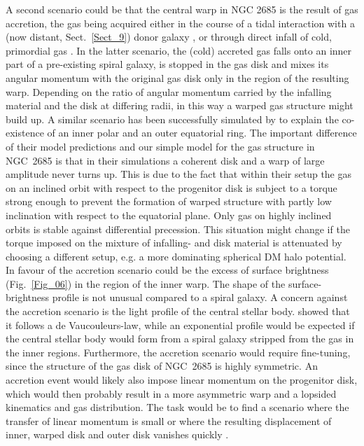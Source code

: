 \documentclass[oldversion]{aa}
\begin{document}
A second scenario could be that the central warp in NGC 2685 is the
result of gas accretion, the gas being acquired either in the course
of a tidal interaction with a (now distant, Sect.~\ref{Sect_9}) donor
galaxy \citep[][]{Schweizer83,Reshetnikov97,Bournaud03}, or through
direct infall of cold, primordial gas \citep[][]{Maccio06}.  In the
latter scenario, the (cold) accreted gas falls onto an inner part of a
pre-existing spiral galaxy, is stopped in the gas disk and mixes its
angular momentum with the original gas disk only in the region of the
resulting warp. Depending on the ratio of angular momentum carried by
the infalling material and the disk at differing radii, in this way a
warped gas structure might build up. A similar scenario has been
successfully simulated by \citet[][]{Bournaud03} to explain the
co-existence of an inner polar and an outer equatorial ring. The
important difference of their model predictions and our simple model
for the gas structure in NGC~2685 is that in their simulations a
coherent disk and a warp of large amplitude never turns up. This is
due to the fact that within their setup the gas on an inclined orbit
with respect to the progenitor disk is subject to a torque strong
enough to prevent the formation of warped structure with partly low
inclination with respect to the equatorial plane. Only gas on highly
inclined orbits is stable against differential precession. This
situation might change if the torque imposed on the mixture of
infalling- and disk material is attenuated by choosing a different
setup, e.g. a more dominating spherical DM halo potential. In favour
of the accretion scenario could be the excess of  surface
brightness (Fig.~\ref{Fig_06}) in the region of the inner warp.  The
shape of the  surface-brightness profile is not unusual
compared to a spiral galaxy. A concern against the accretion scenario
is the light profile of the central stellar
body. \citet[][]{Peletier93} showed that it follows a de
Vaucouleurs-law, while an exponential profile would be expected if the
central stellar body would form from a spiral galaxy stripped from the
gas in the inner regions. Furthermore, the accretion scenario would
require fine-tuning, since the structure of the gas disk of NGC~2685
is highly symmetric. An accretion event would likely also impose
linear momentum on the progenitor disk, which would then probably
result in a more asymmetric warp and a lopsided kinematics and gas
distribution. The task would be to find a scenario where the transfer
of linear momentum is small or where the resulting displacement of
inner, warped disk and outer disk vanishes quickly
\citep[see e.g. ][on the topic of warp formation through gas
infall]{Sanchez-Salcedo05}.
\end{document}
